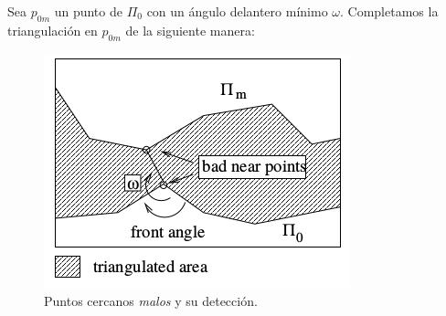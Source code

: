 Sea $p_{0m}$ un punto de $\Pi_0$  con un ángulo delantero mínimo $\omega$. Completamos la triangulación en $p_{0m}$ de la siguiente manera:

\begin{figure}[h]
\centering
\includegraphics[scale=0.5]{images/hartmann4.png}
\caption{Puntos cercanos \textit{malos} y su detección.}
\end{figure}

